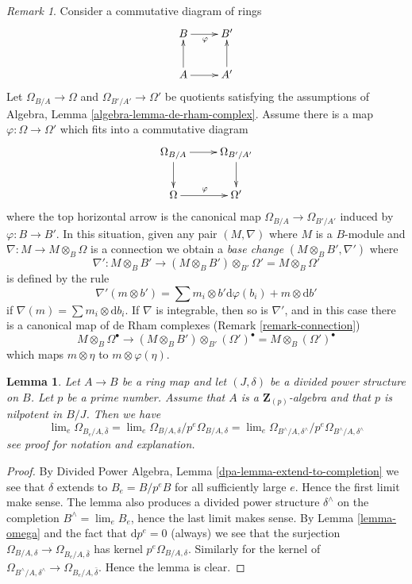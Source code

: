 \documentclass{stacks-project}
\theoremstyle{plain}
\newtheorem{lemma}[subsection]{Lemma}
\theoremstyle{definition}
\theoremstyle{remark}
\newtheorem{remark}[subsection]{Remark}
\numberwithin{equation}{subsection}
\def\lim{\mathop{\mathrm{lim}}\nolimits}
\begin{document}
\begin{remark}
\label{remark-base-change-connection}
Consider a commutative diagram of rings
$$
\xymatrix{
B \ar[r]_\varphi & B' \\
A \ar[u] \ar[r] & A' \ar[u]
}
$$
Let $\Omega_{B/A} \to \Omega$ and $\Omega_{B'/A'} \to \Omega'$
be quotients satisfying the assumptions of
Algebra, Lemma \ref{algebra-lemma-de-rham-complex}.
Assume there is a map $\varphi : \Omega \to \Omega'$ which
fits into a commutative diagram
$$
\xymatrix{
\Omega_{B/A} \ar[r] \ar[d] &
\Omega_{B'/A'} \ar[d] \\
\Omega \ar[r]^{\varphi} &
\Omega'
}
$$
where the top horizontal arrow is the canonical map
$\Omega_{B/A} \to \Omega_{B'/A'}$ induced by $\varphi : B \to B'$.
In this situation, given any pair $(M, \nabla)$ where $M$ is a $B$-module
and $\nabla : M \to M \otimes_B \Omega$ is a connection
we obtain a {\it base change} $(M \otimes_B B', \nabla')$ where
$$
\nabla' :
M \otimes_B B'
\longrightarrow
(M \otimes_B B') \otimes_{B'} \Omega' = M \otimes_B \Omega'
$$
is defined by the rule
$$
\nabla'(m \otimes b') =
\sum m_i \otimes b'\text{d}\varphi(b_i) + m \otimes \text{d}b' 
$$
if $\nabla(m) = \sum m_i \otimes \text{d}b_i$. If $\nabla$ is integrable,
then so is $\nabla'$, and in this case there is a canonical map of
de Rham complexes (Remark \ref{remark-connection})
\begin{equation}
\label{equation-base-change-map-complexes}
M \otimes_B \Omega^\bullet
\longrightarrow
(M \otimes_B B') \otimes_{B'} (\Omega')^\bullet =
M \otimes_B (\Omega')^\bullet
\end{equation}
which maps $m \otimes \eta$ to $m \otimes \varphi(\eta)$.
\end{remark}

\begin{lemma}
\label{lemma-differentials-completion}
Let $A \to B$ be a ring map and let $(J, \delta)$ be a divided power
structure on $B$. Let $p$ be a prime number. Assume that $A$ is a
$\mathbf{Z}_{(p)}$-algebra and that $p$ is nilpotent in $B/J$. Then
we have
$$
\lim_e \Omega_{B_e/A, \bar\delta} =
\lim_e \Omega_{B/A, \delta}/p^e\Omega_{B/A, \delta} =
\lim_e \Omega_{B^\wedge/A, \delta^\wedge}/p^e \Omega_{B^\wedge/A, \delta^\wedge}
$$
see proof for notation and explanation.
\end{lemma}

\begin{proof}
By Divided Power Algebra, Lemma \ref{dpa-lemma-extend-to-completion}
we see that $\delta$ extends
to $B_e = B/p^eB$ for all sufficiently large $e$. Hence the first limit
make sense. The lemma also produces a divided power structure $\delta^\wedge$
on the completion $B^\wedge = \lim_e B_e$, hence the last limit makes
sense. By Lemma \ref{lemma-omega}
and the fact that $\text{d}p^e = 0$ (always)
we see that the surjection
$\Omega_{B/A, \delta} \to \Omega_{B_e/A, \bar\delta}$ has kernel
$p^e\Omega_{B/A, \delta}$. Similarly for the kernel of 
$\Omega_{B^\wedge/A, \delta^\wedge} \to \Omega_{B_e/A, \bar\delta}$.
Hence the lemma is clear.
\end{proof}
\end{document}
